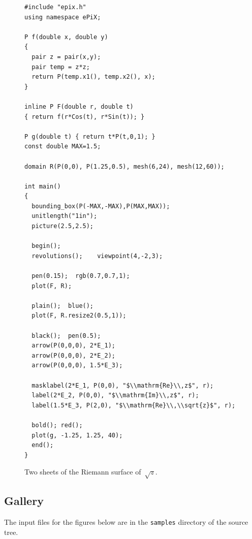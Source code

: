 \documentclass[11pt]{article}
\begin{document}
\begin{figure}[hbt]
\begin{center}

\vspace*{-2.25in}
\begin{footnotesize}
\begin{verbatim}
#include "epix.h"
using namespace ePiX;

P f(double x, double y)
{
  pair z = pair(x,y);
  pair temp = z*z;
  return P(temp.x1(), temp.x2(), x);
}

inline P F(double r, double t)
{ return f(r*Cos(t), r*Sin(t)); }

P g(double t) { return t*P(t,0,1); }
const double MAX=1.5;

domain R(P(0,0), P(1.25,0.5), mesh(6,24), mesh(12,60));

int main() 
{
  bounding_box(P(-MAX,-MAX),P(MAX,MAX));
  unitlength("1in");
  picture(2.5,2.5);

  begin();
  revolutions();    viewpoint(4,-2,3);

  pen(0.15);  rgb(0.7,0.7,1); 
  plot(F, R);

  plain();  blue(); 
  plot(F, R.resize2(0.5,1));

  black();  pen(0.5);
  arrow(P(0,0,0), 2*E_1);
  arrow(P(0,0,0), 2*E_2);
  arrow(P(0,0,0), 1.5*E_3);

  masklabel(2*E_1, P(0,0), "$\\mathrm{Re}\\,z$", r);
  label(2*E_2, P(0,0), "$\\mathrm{Im}\\,z$", r);
  label(1.5*E_3, P(2,0), "$\\mathrm{Re}\\,\\sqrt{z}$", r);

  bold(); red();
  plot(g, -1.25, 1.25, 40);
  end();
}
\end{verbatim}
\end{footnotesize}
\caption{Two sheets of the Riemann surface of~$\sqrt{z}$.}
\label{fig:sqrt}
\end{center}
\end{figure}

\clearpage

\subsection*{Gallery}

\noindent The input files for the figures below are in the
\texttt{samples} directory of the source tree.

\begin{center}
\hspace*{1in}

\vspace*{0.5in}

\hspace*{1in}

\vfil

\hspace*{1in}

\end{center}
\end{document}
